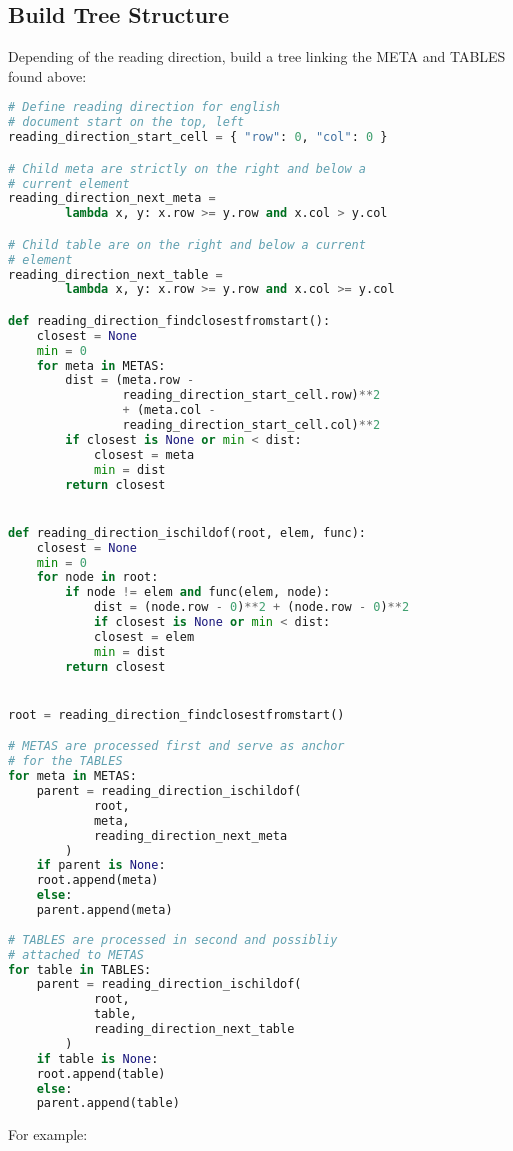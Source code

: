 \documentclass{article}
\begin{document}
\subsection{Build Tree Structure}
Depending of the reading direction, build a tree linking the META and TABLES found above:

\begin{lstlisting}[language=Python, caption=Tree Structure]
# Define reading direction for english
# document start on the top, left
reading_direction_start_cell = { "row": 0, "col": 0 }

# Child meta are strictly on the right and below a
# current element
reading_direction_next_meta =
        lambda x, y: x.row >= y.row and x.col > y.col

# Child table are on the right and below a current
# element
reading_direction_next_table =
        lambda x, y: x.row >= y.row and x.col >= y.col

def reading_direction_findclosestfromstart():
    closest = None
    min = 0
    for meta in METAS:
        dist = (meta.row - 
                reading_direction_start_cell.row)**2
                + (meta.col -
                reading_direction_start_cell.col)**2
        if closest is None or min < dist:
            closest = meta
            min = dist
        return closest


def reading_direction_ischildof(root, elem, func):
    closest = None
    min = 0
    for node in root:
        if node != elem and func(elem, node):
            dist = (node.row - 0)**2 + (node.row - 0)**2
            if closest is None or min < dist:
            closest = elem
            min = dist
        return closest


root = reading_direction_findclosestfromstart()

# METAS are processed first and serve as anchor
# for the TABLES
for meta in METAS:
    parent = reading_direction_ischildof(
            root,
            meta,
            reading_direction_next_meta
        )
    if parent is None:
    root.append(meta)
    else:
    parent.append(meta)
    
# TABLES are processed in second and possibliy
# attached to METAS
for table in TABLES:
    parent = reading_direction_ischildof(
            root,
            table,
            reading_direction_next_table
        )
    if table is None:
    root.append(table)
    else:
    parent.append(table)
\end{lstlisting}

For example:
\end{document}
